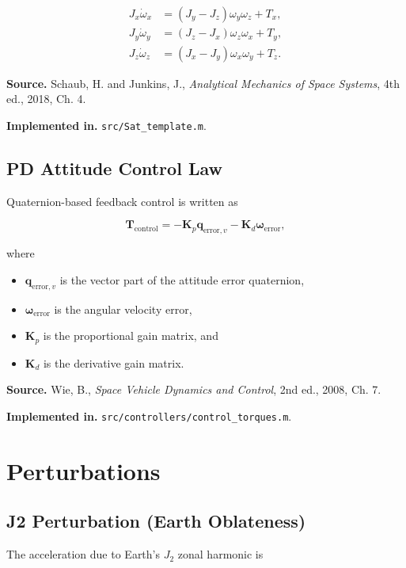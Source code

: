 \documentclass[11pt]{article}
\newcommand{\vect}[1]{\boldsymbol{#1}}
\begin{document}
\begin{align}
J_x \dot{\omega}_x &= (J_y - J_z)\omega_y\omega_z + T_x, \\
J_y \dot{\omega}_y &= (J_z - J_x)\omega_z\omega_x + T_y, \\
J_z \dot{\omega}_z &= (J_x - J_y)\omega_x\omega_y + T_z.
\end{align}

\textbf{Source.} Schaub, H. and Junkins, J., \emph{Analytical Mechanics
of Space Systems}, 4th ed., 2018, Ch. 4.

\textbf{Implemented in.} \texttt{src/Sat\_template.m}.

\subsection{PD Attitude Control Law}

Quaternion-based feedback control is written as

\begin{equation}
\vect{T}_{\mathrm{control}} = -\mathbf{K}_p\vect{q}_{\mathrm{error},v} - \mathbf{K}_d\vect{\omega}_{\mathrm{error}},
\end{equation}

where

\begin{itemize}
\item $\vect{q}_{\mathrm{error},v}$ is the vector part of the attitude
error quaternion,
\item $\vect{\omega}_{\mathrm{error}}$ is the angular velocity error,
\item $\mathbf{K}_p$ is the proportional gain matrix, and
\item $\mathbf{K}_d$ is the derivative gain matrix.
\end{itemize}

\textbf{Source.} Wie, B., \emph{Space Vehicle Dynamics and Control}, 2nd
ed., 2008, Ch. 7.

\textbf{Implemented in.} \texttt{src/controllers/control\_torques.m}.

\section{Perturbations}

\subsection{J2 Perturbation (Earth Oblateness)}

The acceleration due to Earth's $J_2$ zonal harmonic is
\end{document}
